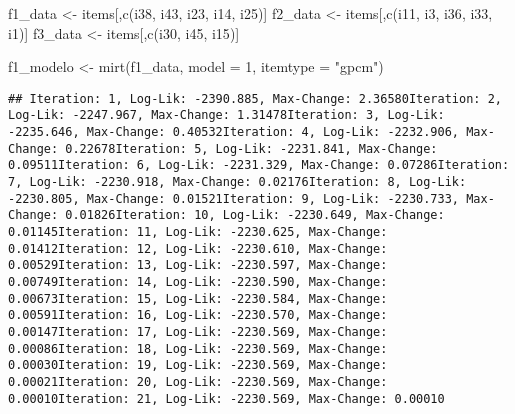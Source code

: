 \documentclass[
]{article}
\newenvironment{Shaded}{\begin{snugshade}}{\end{snugshade}}
\newcommand{\AttributeTok}[1]{\textcolor[rgb]{0.77,0.63,0.00}{#1}}
\newcommand{\DecValTok}[1]{\textcolor[rgb]{0.00,0.00,0.81}{#1}}
\newcommand{\FunctionTok}[1]{\textcolor[rgb]{0.00,0.00,0.00}{#1}}
\newcommand{\NormalTok}[1]{#1}
\newcommand{\OtherTok}[1]{\textcolor[rgb]{0.56,0.35,0.01}{#1}}
\newcommand{\StringTok}[1]{\textcolor[rgb]{0.31,0.60,0.02}{#1}}
\begin{document}
\begin{Shaded}
\begin{Highlighting}[]
\NormalTok{f1\_data }\OtherTok{\textless{}{-}}\NormalTok{ items[,}\FunctionTok{c}\NormalTok{(}\StringTok{\textquotesingle{}i38\textquotesingle{}}\NormalTok{, }\StringTok{\textquotesingle{}i43\textquotesingle{}}\NormalTok{, }\StringTok{\textquotesingle{}i23\textquotesingle{}}\NormalTok{, }\StringTok{\textquotesingle{}i14\textquotesingle{}}\NormalTok{, }\StringTok{\textquotesingle{}i25\textquotesingle{}}\NormalTok{)]}
\NormalTok{f2\_data }\OtherTok{\textless{}{-}}\NormalTok{ items[,}\FunctionTok{c}\NormalTok{(}\StringTok{\textquotesingle{}i11\textquotesingle{}}\NormalTok{,  }\StringTok{\textquotesingle{}i3\textquotesingle{}}\NormalTok{, }\StringTok{\textquotesingle{}i36\textquotesingle{}}\NormalTok{, }\StringTok{\textquotesingle{}i33\textquotesingle{}}\NormalTok{,  }\StringTok{\textquotesingle{}i1\textquotesingle{}}\NormalTok{)]}
\NormalTok{f3\_data }\OtherTok{\textless{}{-}}\NormalTok{ items[,}\FunctionTok{c}\NormalTok{(}\StringTok{\textquotesingle{}i30\textquotesingle{}}\NormalTok{, }\StringTok{\textquotesingle{}i45\textquotesingle{}}\NormalTok{, }\StringTok{\textquotesingle{}i15\textquotesingle{}}\NormalTok{)]}


\NormalTok{f1\_modelo }\OtherTok{\textless{}{-}} \FunctionTok{mirt}\NormalTok{(f1\_data, }\AttributeTok{model =} \DecValTok{1}\NormalTok{, }\AttributeTok{itemtype =} \StringTok{"gpcm"}\NormalTok{)}
\end{Highlighting}
\end{Shaded}

\begin{verbatim}
## Iteration: 1, Log-Lik: -2390.885, Max-Change: 2.36580Iteration: 2, Log-Lik: -2247.967, Max-Change: 1.31478Iteration: 3, Log-Lik: -2235.646, Max-Change: 0.40532Iteration: 4, Log-Lik: -2232.906, Max-Change: 0.22678Iteration: 5, Log-Lik: -2231.841, Max-Change: 0.09511Iteration: 6, Log-Lik: -2231.329, Max-Change: 0.07286Iteration: 7, Log-Lik: -2230.918, Max-Change: 0.02176Iteration: 8, Log-Lik: -2230.805, Max-Change: 0.01521Iteration: 9, Log-Lik: -2230.733, Max-Change: 0.01826Iteration: 10, Log-Lik: -2230.649, Max-Change: 0.01145Iteration: 11, Log-Lik: -2230.625, Max-Change: 0.01412Iteration: 12, Log-Lik: -2230.610, Max-Change: 0.00529Iteration: 13, Log-Lik: -2230.597, Max-Change: 0.00749Iteration: 14, Log-Lik: -2230.590, Max-Change: 0.00673Iteration: 15, Log-Lik: -2230.584, Max-Change: 0.00591Iteration: 16, Log-Lik: -2230.570, Max-Change: 0.00147Iteration: 17, Log-Lik: -2230.569, Max-Change: 0.00086Iteration: 18, Log-Lik: -2230.569, Max-Change: 0.00030Iteration: 19, Log-Lik: -2230.569, Max-Change: 0.00021Iteration: 20, Log-Lik: -2230.569, Max-Change: 0.00010Iteration: 21, Log-Lik: -2230.569, Max-Change: 0.00010
\end{verbatim}
\end{document}
